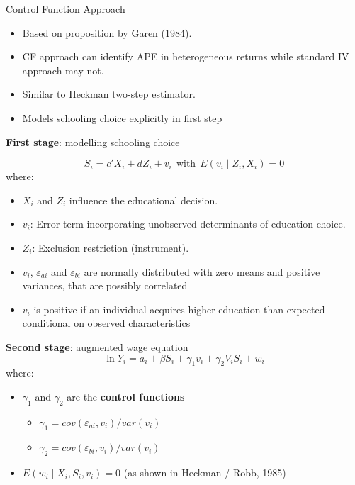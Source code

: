 \documentclass[10pt,ignorenonframetext,]{beamer}
\providecommand{\tightlist}{%
  \setlength{\itemsep}{0pt}\setlength{\parskip}{0pt}}
\begin{document}
\begin{frame}[allowframebreaks]{Control Function Approach}
\protect\hypertarget{control-function-approach}{}

\begin{itemize}
\tightlist
\item
  Based on proposition by Garen (1984).
\item
  CF approach can identify APE in heterogeneous returns while standard
  IV approach may not.
\item
  Similar to Heckman two-step estimator.
\item
  Models schooling choice explicitly in first step
\end{itemize}

\textbf{First stage}: modelling schooling choice

\[S_i = c'X_i + dZ_i + v_i ~~\text{with}~~ E(v_i \mid Z_i, X_i) = 0\]
where:

\begin{itemize}
\item
  \(X_i\) and \(Z_i\) influence the educational decision.
\item
  \(v_i\): Error term incorporating unobserved determinants of education
  choice.
\item
  \(Z_i\): Exclusion restriction (instrument).
\item
  \(v_i\), \(\varepsilon_{ai}\) and \(\varepsilon_{bi}\) are normally
  distributed with zero means and positive variances, that are possibly
  correlated
\item
  \(v_i\) is positive if an individual acquires higher education than
  expected conditional on observed characteristics
\end{itemize}

\textbf{Second stage}: augmented wage equation
\[\ln Y_i = a_i + \beta S_i + \gamma_1 v_i + \gamma_2 V_iS_i + w_i
\] where:

\begin{itemize}
\item
  \(\gamma_1\) and \(\gamma_2\) are the \textbf{control functions}

  \begin{itemize}
  \item
    \(\gamma_1 = cov(\varepsilon_{ai}, v_i) /var(v_i)\)
  \item
    \(\gamma_2 = cov(\varepsilon_{bi}, v_i) /var(v_i)\)
  \end{itemize}
\item
  \(E(w_i \mid X_i, S_i, v_i) = 0\) (as shown in Heckman / Robb, 1985)
\end{itemize}

\end{frame}
\end{document}
